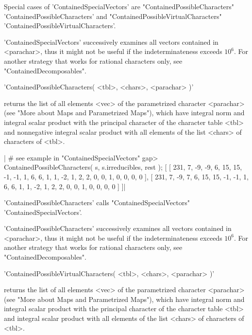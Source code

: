 Special cases of 'ContainedSpecialVectors' are
"ContainedPossibleCharacters" 'ContainedPossibleCharacters' and
"ContainedPossibleVirtualCharacters"
'ContainedPossibleVirtualCharacters'.

'ContainedSpecialVectors' successively  examines all vectors contained in
<parachar>, thus it might not be  useful if the indeterminateness exceeds
$10^6$.  For another strategy  that  works for rational characters  only,
see "ContainedDecomposables".


'ContainedPossibleCharacters( <tbl>, <chars>, <parachar> )'

returns the  list of all   elements <vec>  of the parametrized  character
<parachar> (see  "More  about Maps and  Parametrized  Maps"), which  have
integral norm and integral scalar product with the principal character of
the character  table <tbl> and nonnegative  integral scalar  product with
all elements of the list <chars> of characters of <tbl>.

|    # see example in "ContainedSpecialVectors"
    gap> ContainedPossibleCharacters( s, s.irreducibles, rest );
    [ [ 231, 7, -9, -9, 6, 15, 15, -1, -1, 1, 6, 6, 1, 1, -2, 1, 2, 2, 0,
          0, 1, 0, 0, 0, 0 ],
      [ 231, 7, -9, 7, 6, 15, 15, -1, -1, 1, 6, 6, 1, 1, -2, 1, 2, 2, 0,
          0, 1, 0, 0, 0, 0 ] ]|

'ContainedPossibleCharacters'       calls       "ContainedSpecialVectors"
'ContainedSpecialVectors'.

'ContainedPossibleCharacters' successively examines all vectors contained
in <parachar>,  thus  it might not  be   useful if the  indeterminateness
exceeds $10^6$.  For another strategy that  works for rational characters
only, see "ContainedDecomposables".


'ContainedPossibleVirtualCharacters( <tbl>, <chars>, <parachar> )'

returns the  list  of all elements <vec>  of  the parametrized  character
<parachar> (see  "More about  Maps  and  Parametrized Maps"), which  have
integral norm and integral scalar product with the principal character of
the  character table <tbl> and  integral scalar product with all elements
of the list <chars> of characters of <tbl>.


